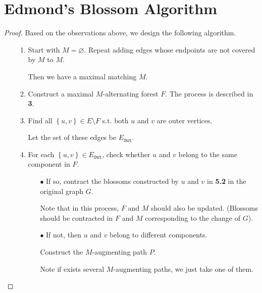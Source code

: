 \documentclass{article}
\newcommand{\set}[1]{\left\{#1\right\}}
\begin{document}
\section{Edmond's Blossom Algorithm}
\vspace{1em}
\begin{proof}
    Based on the observations above, we design the following algorithm.
    
    \begin{itemize}
        \item[] \begin{enumerate}
            \item Start with $M=\varnothing.$ Repeat adding edges whose endpoints are not covered by $M$ to $M$. 
            
            Then we have a maximal matching $M$.
            
            \item Construct a maximal $M$-alternating forest $F$. The process is described in \textbf{3}.
            
            \item Find all $\set{u,v}\in E\setminus F$ s.t. both $u$ and $v$ are outer vertices. 
            
            Let the set of these edges be $E_{\mathtt{Out}}$.
            
            \item For each $\set{u,v}\in E_{\mathtt{Out}}$, check whether $u$ and $v$ belong to the same component in $F$.
            
            \begin{itemize}
                \item[$\bullet$] If so, contract the blossoms constructed by $u$ and $v$ in \textbf{5.2} in the original graph $G$. 
            
                Note that in this process, $F$ and $M$ should also be updated. (Blossoms should be contracted in $F$ and $M$ corresponding to the change of $G$).
                
                \item[$\bullet$] If not, then $u$ and $v$ belong to different components. 
                
                Construct the $M$-augmenting path $P$.
                
                Note if exists several $M$-augmenting paths, we just take one of them.
            \end{itemize}
            

\end{enumerate}
\end{itemize}
\end{proof}
\end{document}
